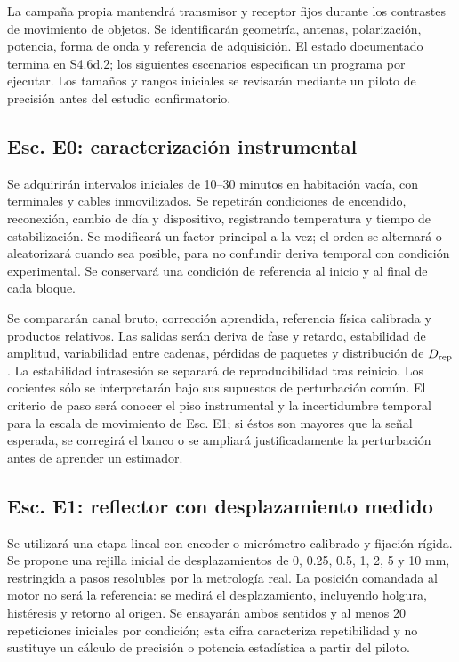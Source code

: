 La campaña propia mantendrá transmisor y receptor fijos durante los contrastes de
movimiento de objetos. Se identificarán geometría, antenas, polarización, potencia,
forma de onda y referencia de adquisición. El estado documentado termina en S4.6d.2;
los siguientes escenarios especifican un programa por ejecutar. Los tamaños y rangos
iniciales se revisarán mediante un piloto de precisión antes del estudio confirmatorio.

\subsection{Esc. E0: caracterización instrumental}
\label{sec:scenario_e0}

Se adquirirán intervalos iniciales de 10--30 minutos en habitación vacía, con terminales
y cables inmovilizados. Se repetirán condiciones de encendido, reconexión, cambio de
día y dispositivo, registrando temperatura y tiempo de estabilización. Se modificará
un factor principal a la vez; el orden se alternará o aleatorizará cuando sea posible,
para no confundir deriva temporal con condición experimental. Se conservará una
condición de referencia al inicio y al final de cada bloque.

Se compararán canal bruto, corrección aprendida, referencia física calibrada y productos
relativos. Las salidas serán deriva de fase y retardo, estabilidad de amplitud,
variabilidad entre cadenas, pérdidas de paquetes y distribución de $D_{\rm rep}$.
La estabilidad intrasesión se separará de reproducibilidad tras reinicio. Los cocientes
sólo se interpretarán bajo sus supuestos de perturbación común. El criterio de paso
será conocer el piso instrumental y la incertidumbre temporal para la escala de
movimiento de Esc. E1; si éstos son mayores que la señal esperada, se corregirá el
banco o se ampliará justificadamente la perturbación antes de aprender un estimador.

\subsection{Esc. E1: reflector con desplazamiento medido}
\label{sec:scenario_e1}

Se utilizará una etapa lineal con encoder o micrómetro calibrado y fijación rígida.
Se propone una rejilla inicial de desplazamientos de 0, 0.25, 0.5, 1, 2, 5 y 10 mm,
restringida a pasos resolubles por la metrología real. La posición comandada al motor
no será la referencia: se medirá el desplazamiento, incluyendo holgura, histéresis
y retorno al origen. Se ensayarán ambos sentidos y al menos 20 repeticiones iniciales
por condición; esta cifra caracteriza repetibilidad y no sustituye un cálculo de
precisión o potencia estadística a partir del piloto.

